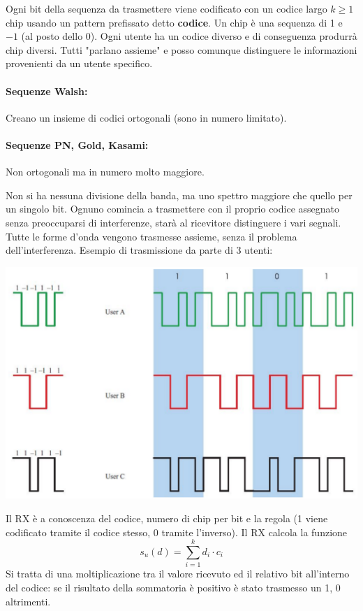 Ogni bit della sequenza da trasmettere viene codificato con un codice largo $k \geq 1$ chip usando un pattern prefissato detto \textbf{codice}. Un chip è una sequenza di 1 e $-1$ (al posto dello $0$). Ogni utente ha un codice diverso e di conseguenza produrrà chip diversi. Tutti "parlano assieme" e posso comunque distinguere le informazioni provenienti da un utente specifico.

\paragraph{Sequenze Walsh:} Creano un insieme di codici ortogonali (sono in numero limitato).

\paragraph{Sequenze PN, Gold, Kasami:} Non ortogonali ma in numero molto maggiore.

Non si ha nessuna divisione della banda, ma uno spettro maggiore che quello per un singolo bit. Ognuno comincia a trasmettere con il proprio codice assegnato senza preoccuparsi di interferenze, starà al ricevitore distinguere i vari segnali. Tutte le forme d'onda vengono trasmesse assieme, senza il problema dell'interferenza.
Esempio di trasmissione da parte di 3 utenti:
\begin{center}
	\includegraphics[width=0.6\linewidth]{img/wireless/CDMA1}
\end{center}

Il RX è a conoscenza del codice, numero di chip per bit e la regola (1 viene codificato tramite il codice stesso, 0 tramite l'inverso). Il RX calcola la funzione
$$ s_u (d) = \sum_{i=1}^{k} d_i \cdot c_i $$ 
Si tratta di una moltiplicazione tra il valore ricevuto ed il relativo bit all'interno del codice: se il risultato della sommatoria è positivo è stato trasmesso un 1, 0 altrimenti.

